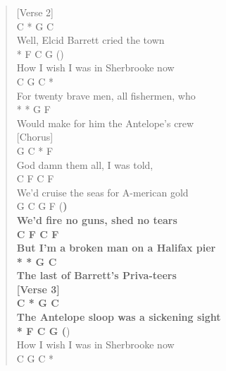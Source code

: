 \documentclass[11pt]{article}
\begin{document}
\begin{verse}
{[Verse 2]\\
\hspace*{6em}C     *       G         C\\
Well, Elcid Barrett cried the town\\
\hspace*{6em}*      F      C          G    (})\\
How I wish I was in Sherbrooke now\\
\hspace*{4em}C            G        C          *\\
For twenty brave men, all fishermen, who\\
\hspace*{6em}*        *       G          F\\
Would make for him the Antelope's crew\\
\vspace*{1em}
[Chorus]\\
\hspace*{4em}G         C    *     F\\
God damn them all, I was told,\\
\hspace*{5em}C          F          C       F\\
We'd cruise the seas for A-merican gold\\
\hspace*{5em}G       C     G       F     (\textbf{)\\
We'd fire no guns, shed no tears\\
\hspace*{10em}C      F        C       F\\
But I'm a broken man on a Halifax pier\\
\hspace*{4em}*       *         G     C\\
The last of Barrett's Priva-teers\\
\vspace*{1em}
[Verse 3]\\
\hspace*{4em}C        *           G         C\\
The Antelope sloop was a sickening sight\\
\hspace*{6em}*      F      C          G    (})\\
How I wish I was in Sherbrooke now\\
\hspace*{8em}C           G            C        *\\

\end{verse}
\end{document}
